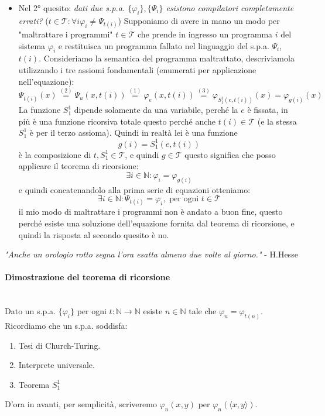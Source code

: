 \documentclass{article}
\begin{document}
\begin{itemize}
    \item Nel 2° quesito: \textit{dati due s.p.a. $\{\varphi_i\},\{\Psi_i\}$ esistono compilatori completamente errati?}
          ($t\in\mathcal{T}:\forall i \varphi_i\neq\Psi_{t(i)}$) Supponiamo di avere in mano un modo
          per "maltrattare i programmi" $t\in\mathcal{T}$ che prende in ingresso un programma $i$ del sistema $\varphi_i$
          e restituisca un programma fallato nel linguaggio del s.p.a. $\Psi_i$, $t(i)$.
          Consideriamo la semantica del programma maltrattato, descriviamola utilizzando
          i tre assiomi fondamentali (enumerati per applicazione nell'equazione):
          $$\Psi_{t(i)}(x)\overset{(2)}{=}\Psi_u(x,t(i))\overset{(1)}{=}\varphi_e(x,t(i))\overset{(3)}{=}\varphi_{S_1^1(e,t(i))}(x)=\varphi_{g(i)}(x)$$
          La funzione $S_1^1$ dipende solamente da una variabile, perché la $e$ è fissata, in più è
          una funzione ricorsiva totale questo perché anche $t(i)\in\mathcal{T}$ (e la stessa $S_1^1$ è per
          il terzo assioma). Quindi in realtà lei è una funzione
          $$g(i)=S_1^1(e,t(i))$$ è la composizione di $t,S_1^1\in\mathcal{T}$, e quindi $g\in\mathcal{T}$
          questo significa che posso applicare il teorema di ricorsione:
          $$\exists i\in\mathbb{N}:\varphi_i=\varphi_{g(i)}$$
          e quindi concatenandolo alla prima serie di equazioni otteniamo:
          $$\exists i\in\mathbb{N}:\Psi_{t(i)}=\varphi_i,\text{ per ogni }t\in\mathcal{T}$$
          il mio modo di maltrattare i programmi non è andato a buon fine, questo perché esiste
          una soluzione dell'equazione fornita dal teorema di ricorsione, e quindi la risposta al
          secondo quesito è no.
\end{itemize}

\begin{center}
    \textit{"Anche un orologio rotto segna l'ora esatta almeno due volte al giorno."} - H.Hesse
\end{center}

\paragraph{Dimostrazione del teorema di ricorsione}\mbox{}\\
Dato un s.p.a. $\{\varphi_i\}$ per ogni $t:\mathbb{N}\rightarrow\mathbb{N}$ esiste
$n\in\mathbb{N}$ tale che $\varphi_n=\varphi_{t(n)}$.
Ricordiamo che un s.p.a. soddisfa:
\begin{enumerate}
    \item Tesi di Church-Turing.
    \item Interprete universale.
    \item Teorema $S_1^1$
\end{enumerate}
D'ora in avanti, per semplicità, scriveremo $\varphi_n(x,y)$ per $\varphi_n(\langle x,y\rangle)$.
\end{document}
